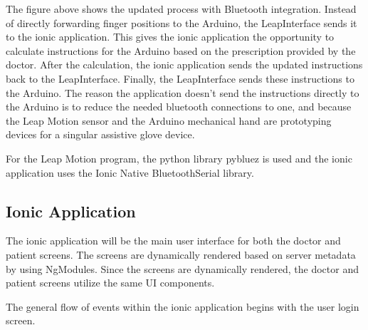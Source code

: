 \documentclass[a4paper,10pt]{article}
\begin{document}
            The figure above shows the updated process with Bluetooth integration. Instead of directly forwarding finger positions to the Arduino, the LeapInterface sends it to the ionic application. This gives the ionic application the opportunity to calculate instructions for the Arduino based on the prescription provided by the doctor. After the calculation, the ionic application sends the updated instructions back to the LeapInterface. Finally, the LeapInterface sends these instructions to the Arduino. The reason the application doesn't send the instructions directly to the Arduino is to reduce the needed bluetooth connections to one, and because the Leap Motion sensor and the Arduino mechanical hand are prototyping devices for a singular assistive glove device.
            
            For the Leap Motion program, the python library pybluez is used and the ionic application uses the Ionic Native BluetoothSerial library.
           
            
        \subsection{Ionic Application}
            The ionic application will be the main user interface for both the doctor and patient screens. The screens are dynamically rendered based on server metadata by using NgModules. Since the screens are dynamically rendered, the doctor and patient screens utilize the same UI components.
            
            
            The general flow of events within the ionic application begins with the user login screen. 
            
\end{document}
